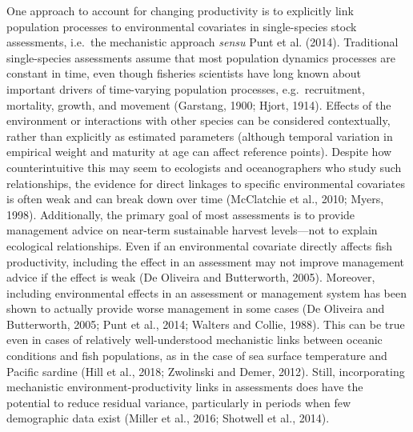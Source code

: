 \documentclass[]{article}
\begin{document}
One approach to account for changing productivity is to explicitly link
population processes to environmental covariates in single-species stock
assessments, i.e.~the mechanistic approach \emph{sensu} Punt et al.
(2014). Traditional single-species assessments assume that most
population dynamics processes are constant in time, even though
fisheries scientists have long known about important drivers of
time-varying population processes, e.g.~recruitment, mortality, growth,
and movement (Garstang, 1900; Hjort, 1914). Effects of the environment
or interactions with other species can be considered contextually,
rather than explicitly as estimated parameters (although temporal
variation in empirical weight and maturity at age can affect reference
points). Despite how counterintuitive this may seem to ecologists and
oceanographers who study such relationships, the evidence for direct
linkages to specific environmental covariates is often weak and can
break down over time (McClatchie et al., 2010; Myers, 1998).
Additionally, the primary goal of most assessments is to provide
management advice on near-term sustainable harvest levels---not to
explain ecological relationships. Even if an environmental covariate
directly affects fish productivity, including the effect in an
assessment may not improve management advice if the effect is weak (De
Oliveira and Butterworth, 2005). Moreover, including environmental
effects in an assessment or management system has been shown to actually
provide worse management in some cases (De Oliveira and Butterworth,
2005; Punt et al., 2014; Walters and Collie, 1988). This can be true
even in cases of relatively well-understood mechanistic links between
oceanic conditions and fish populations, as in the case of sea surface
temperature and Pacific sardine (Hill et al., 2018; Zwolinski and Demer,
2012). Still, incorporating mechanistic environment-productivity links
in assessments does have the potential to reduce residual variance,
particularly in periods when few demographic data exist (Miller et al.,
2016; Shotwell et al., 2014).
\end{document}
